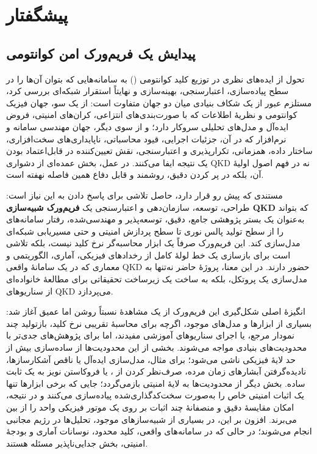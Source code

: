 \chapter*{پیشگفتار}

\section*{پیدایش یک فریم‌ورک امن کوانتومی}

\begin{sloppypar}
تحول از ایده‌های نظری در توزیع کلید کوانتومی () به سامانه‌هایی که بتوان آن‌ها را در سطح پیاده‌سازی، اعتبارسنجی، بهینه‌سازی و نهایتاً استقرار شبکه‌ای بررسی کرد، مستلزم عبور از یک شکاف بنیادی میان دو جهان متفاوت است: از یک سو، جهان فیزیک کوانتومی و نظریهٔ اطلاعات که با صورت‌بندی‌های انتزاعی، کران‌های امنیتی، فروض ایده‌آل و مدل‌های تحلیلی سروکار دارد؛ و از سوی دیگر، جهان مهندسی سامانه و نرم‌افزار که در آن، جزئیات اجرایی، قیود محاسباتی، ناپایداری‌های سخت‌افزاری، ساختار داده، همزمانی، تکرارپذیری و اعتبارسنجی، نقش تعیین‌کننده در قابل‌اعتماد بودن یک نتیجه ایفا می‌کنند. در عمل، بخش عمده‌ای از دشواری QKD نه در فهم اصول اولیهٔ آن، بلکه در پر کردن دقیق، روشمند و قابل دفاع همین فاصله نهفته است.

مستندی که پیش رو قرار دارد، حاصل تلاشی برای پاسخ دادن به این نیاز است: طراحی، توسعه، سازمان‌دهی و اعتبارسنجی یک \textbf{فریم‌ورک شبیه‌سازی QKD} که بتواند به‌عنوان یک بستر پژوهشی جامع، دقیق، توسعه‌پذیر و مهندسی‌شده، رفتار سامانه‌های  را از سطح تولید پالس نوری تا سطح پردازش امنیتی و حتی مسیریابی شبکه‌ای مدل‌سازی کند. این فریم‌ورک صرفاً یک ابزار محاسبه‌گر نرخ کلید نیست، بلکه تلاشی است برای بازسازی یک خط لولهٔ کامل از رخدادهای فیزیکی، آماری، الگوریتمی و معماری که در یک سامانهٔ واقعی QKD حضور دارند. در این معنا، پروژهٔ حاضر نه‌تنها به مدل‌سازی یک پروتکل، بلکه به ساخت یک زیرساخت تحقیقاتی برای مطالعهٔ خانواده‌ای از سناریوهای QKD می‌پردازد.

انگیزهٔ اصلی شکل‌گیری این فریم‌ورک از یک مشاهدهٔ نسبتاً روشن اما عمیق آغاز شد: بسیاری از ابزارها و مدل‌های موجود، اگرچه برای محاسبهٔ تقریبی نرخ کلید، بازتولید چند نمودار مرجع، یا اجرای سناریوهای آموزشی مفیدند، اما برای پژوهش‌های جدی‌تر با محدودیت‌های بنیادی مواجه می‌شوند. بخشی از این محدودیت‌ها از ساده‌سازی بیش از حد لایهٔ فیزیکی ناشی می‌شود؛ برای مثال، مدل‌سازی ایده‌آل یا ناقص آشکارسازها، نادیده‌گرفتن آبشارهای زمان مرده، صرف‌نظر کردن از ، یا فروکاستن نویز به یک ثابت ساده. بخش دیگر از محدودیت‌ها به لایهٔ امنیتی بازمی‌گردد؛ جایی که برخی ابزارها تنها یک اثبات امنیتی خاص را به‌صورت سخت‌کدگذاری‌شده پیاده‌سازی می‌کنند و در نتیجه، امکان مقایسهٔ دقیق و منصفانهٔ چند اثبات بر روی یک موتور فیزیکی واحد را از بین می‌برند. افزون بر این، در بسیاری از شبیه‌سازهای موجود، تحلیل‌ها در رژیم مجانبی انجام می‌شوند؛ در حالی که در سامانه‌های واقعی، کلید محدود، نوسانات آماری و بودجهٔ امنیتی، بخش جدایی‌ناپذیر مسئله هستند.


\end{sloppypar}

